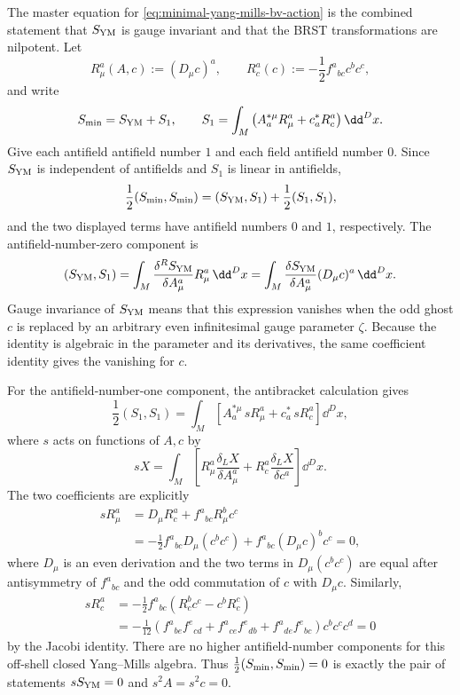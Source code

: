 The master equation for \eqref{eq:minimal-yang-mills-bv-action} is the
combined statement that \(S_{\rm YM}\) is gauge invariant and that the BRST
transformations are nilpotent.  Let
\[
  R_\mu^a(A,c):=(D_\mu c)^a,
  \qquad
  R_c^a(c):=-\frac12 f^a{}_{bc}c^b c^c,
\]
and write
\[
  S_{\rm min}=S_{\rm YM}+S_1,
  \qquad
  S_1=\int_M\left(A^{*\mu}_a R_\mu^a+c^*_aR_c^a\right)\dd^D x .
\]
Give each antifield antifield number \(1\) and each field antifield number
\(0\).  Since \(S_{\rm YM}\) is independent of antifields and \(S_1\) is
linear in antifields,
\[
  \frac12(S_{\rm min},S_{\rm min})
  =
  (S_{\rm YM},S_1)+\frac12(S_1,S_1),
\]
and the two displayed terms have antifield numbers \(0\) and \(1\),
respectively.  The antifield-number-zero component is
\[
  (S_{\rm YM},S_1)
  =
  \int_M
  \frac{\delta^R S_{\rm YM}}{\delta A_\mu^a}
  R_\mu^a\,\dd^D x
  =
  \int_M
  \frac{\delta S_{\rm YM}}{\delta A_\mu^a}
  (D_\mu c)^a\,\dd^D x .
\]
Gauge invariance of \(S_{\rm YM}\) means that this expression vanishes when
the odd ghost \(c\) is replaced by an arbitrary even infinitesimal gauge
parameter \(\zeta\).  Because the identity is algebraic in the parameter and
its derivatives, the same coefficient identity gives the vanishing for \(c\).

For the antifield-number-one component, the antibracket calculation gives
\[
  \frac12(S_1,S_1)
  =
  \int_M
  \left[
    A^{*\mu}_a\,sR_\mu^a
    +
    c^*_a\,sR_c^a
  \right]\dd^D x ,
\]
where \(s\) acts on functions of \(A,c\) by
\[
  sX
  =
  \int_M
  \left[
    R_\mu^a\frac{\delta_L X}{\delta A_\mu^a}
    +
    R_c^a\frac{\delta_L X}{\delta c^a}
  \right]\dd^D x .
\]
The two coefficients are explicitly
\[
\begin{aligned}
  sR_\mu^a
  &=
  D_\mu R_c^a
  +
  f^a{}_{bc}R_\mu^b c^c
\\
  &=
  -\frac12 f^a{}_{bc}D_\mu(c^b c^c)
  +
  f^a{}_{bc}(D_\mu c)^b c^c
  =
  0,
\end{aligned}
\]
where \(D_\mu\) is an even derivation and the two terms in
\(D_\mu(c^b c^c)\) are equal after antisymmetry of \(f^a{}_{bc}\) and the odd
commutation of \(c\) with \(D_\mu c\).  Similarly,
\[
\begin{aligned}
  sR_c^a
  &=
  -\frac12 f^a{}_{bc}
  \left(R_c^b c^c-c^b R_c^c\right)
\\
  &=
  -\frac1{12}
  \left(
    f^a{}_{be}f^e{}_{cd}
    +
    f^a{}_{ce}f^e{}_{db}
    +
    f^a{}_{de}f^e{}_{bc}
  \right)c^b c^c c^d
  =
  0
\end{aligned}
\]
by the Jacobi identity.  There are no higher antifield-number components for
this off-shell closed Yang--Mills algebra.  Thus
\(\frac12(S_{\rm min},S_{\rm min})=0\) is exactly the pair of statements
\(sS_{\rm YM}=0\) and \(s^2A=s^2c=0\).

